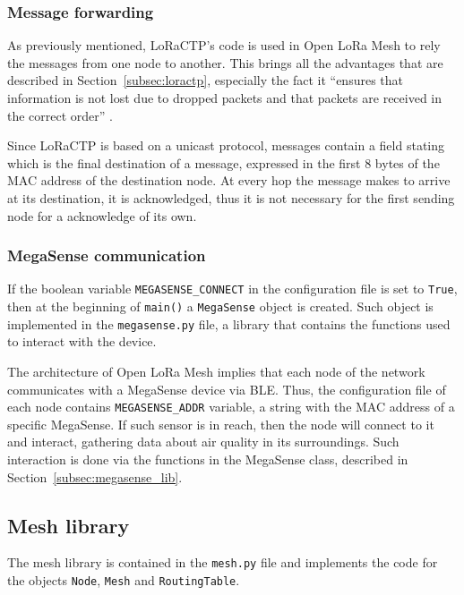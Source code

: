 			\subsubsection{Message forwarding}
			
				As previously mentioned, LoRaCTP's code is used in Open LoRa Mesh to rely the messages from one node to another.
				This brings all the advantages that are described in Section~\ref{subsec:loractp}, especially the fact it ``ensures that information is not lost due to dropped packets and that packets are received in the correct order'' \cite{loractp}.
				
				Since LoRaCTP is based on a unicast protocol, messages contain a field stating which is the final destination of a message, expressed in the first 8 bytes of the MAC address of the destination node.
				At every hop the message makes to arrive at its destination, it is acknowledged, thus it is not necessary for the first sending node for a acknowledge of its own.
			
			\subsubsection{MegaSense communication}
			
				If the boolean variable \texttt{MEGASENSE\_CONNECT} in the configuration file is set to \texttt{True}, then at the beginning of \texttt{main()} a \texttt{MegaSense} object is created.
				Such object is implemented in the \texttt{megasense.py} file, a library that contains the functions used to interact with the device.
				
				The architecture of Open LoRa Mesh implies that each node of the network communicates with a MegaSense device via BLE.
				Thus, the configuration file of each node contains \texttt{MEGASENSE\_ADDR} variable, a string with the MAC address of a specific MegaSense.
				If such sensor is in reach, then the node will connect to it and interact, gathering data about air quality in its surroundings.
				Such interaction is done via the functions in the MegaSense class, described in Section~\ref{subsec:megasense_lib}.
				
		\subsection{Mesh library}\label{subsec:mesh_library}
		
			The mesh library is contained in the \texttt{mesh.py} file and implements the code for the objects \texttt{Node}, \texttt{Mesh} and \texttt{RoutingTable}.
		
